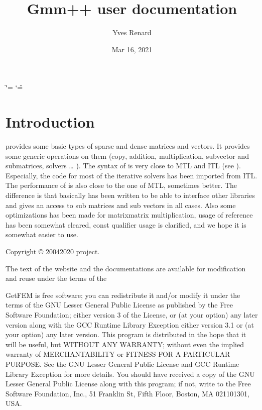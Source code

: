 \documentclass[a4paper,11pt,english]{sphinxmanual}
\title{Gmm++ user documentation}
\date{Mar 16, 2021}
\author{Yves Renard}
\begin{document}
\ifdefined\shorthandoff
  \ifnum\catcode`\=\string=\active\shorthandoff{=}\fi
  \ifnum\catcode`\"=\active{}\fi
\fi

\pagestyle{empty}
\sphinxmaketitle
\pagestyle{plain}
\sphinxtableofcontents
\pagestyle{normal}
\label{\detokenize{gmm/index::doc}}
\begin{figure}[htbp]
\centering

\noindent{}
\end{figure}




\chapter{Introduction}
\label{\detokenize{gmm/intro:introduction}}\label{\detokenize{gmm/intro:gmm-intro}}\label{\detokenize{gmm/intro::doc}}
\sphinxAtStartPar
{} provides some basic types of sparse and dense matrices and vectors. It provides some generic operations on them (copy, addition, multiplication, sub\sphinxhyphen{}vector and sub\sphinxhyphen{}matrices, solvers … ). The syntax of  is very close to MTL and ITL (see ). Especially, the code for most of the iterative solvers has been imported from ITL. The performance of  is also close to the one of MTL, sometimes better. The difference is that basically  has been written to be able to interface other libraries and gives an access to sub matrices and sub vectors in all cases. Also some optimizations has been made for matrix\sphinxhyphen{}matrix multiplication, usage of reference has been somewhat cleared, const qualifier usage is clarified, and we hope it is somewhat easier to use.

\sphinxAtStartPar
Copyright © 2004\sphinxhyphen{}2020  project.

\sphinxAtStartPar
The text of the  website and the documentations are available for modification and reuse under the terms of the 

\sphinxAtStartPar
GetFEM  is  free software;  you  can  redistribute  it  and/or modify it
under  the  terms  of the  GNU  Lesser General Public License as published
by  the  Free Software Foundation;  either version 3 of the License,  or
(at your option) any later version along with the GCC Runtime Library
Exception either version 3.1 or (at your option) any later version.
This program  is  distributed  in  the  hope  that it will be useful,  but
WITHOUT ANY WARRANTY; without even the implied warranty of MERCHANTABILITY
or  FITNESS  FOR  A PARTICULAR PURPOSE.  See the GNU Lesser General Public
License and GCC Runtime Library Exception for more details.
You  should  have received a copy of the GNU Lesser General Public License
along  with  this program;  if not, write to the Free Software Foundation,
Inc., 51 Franklin St, Fifth Floor, Boston, MA  02110\sphinxhyphen{}1301, USA.
\end{document}
